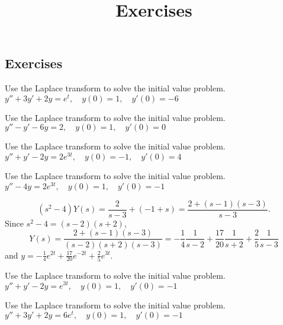 \documentclass{ximera}
\title{Exercises} \license{CC BY-NC-SA 4.0}
\begin{document}
\begin{abstract}
\end{abstract}
\maketitle

\begin{onlineOnly}
\section*{Exercises}
\end{onlineOnly}



\begin{problem}\label{exer:8.3.1} Use the Laplace transform to solve the initial value problem. $y''+3y'+2y=e^t, \quad  y(0)=1,\quad y'(0)=-6$
\end{problem}

\begin{problem}\label{exer:8.3.2} Use the Laplace transform to solve the initial value problem. $y''-y'-6y=2, \quad  y(0)=1,\quad y'(0)=0$
\end{problem}

\begin{problem}\label{exer:8.3.3} Use the Laplace transform to solve the initial value problem. $y''+y'-2y=2e^{3t}, \quad  y(0)=-1,\quad y'(0)=4$
\end{problem}

\begin{problem}\label{exer:8.3.4} Use the Laplace transform to solve the initial value problem. $y''-4y=2 e^{3t}, \quad  y(0)=1,\quad y'(0)=-1$

\begin{solution}
$$
(s^2-4)Y(s)=\frac{2}{s-3}+(-1+s)=\frac{2+(s-1)(s-3)}{s-3}.
$$
Since $s^2-4=(s-2)(s+2)$,
$$
Y(s)=\frac{2+(s-1)(s-3)}{(s-2)(s+2)(s-3)}=
-\frac{1}{4}\frac{1}{s-2}+\frac{17}{20}\frac{1}{s+2}+\frac{2}{5}\frac{1}{s-3}
$$
and   $y=-\frac{1}{4}e^{2t}+\frac{17}{20}e^{-2t}+\frac{2}{5}e^{3t}$.
\end{solution}
\end{problem}

\begin{problem}\label{exer:8.3.5} Use the Laplace transform to solve the initial value problem. $y''+y'-2y=e^{3t}, \quad  y(0)=1,\quad y'(0)=-1$
\end{problem}

\begin{problem}\label{exer:8.3.6} Use the Laplace transform to solve the initial value problem. $y''+3y'+2y=6e^t, \quad  y(0)=1,\quad y'(0)=-1$
\end{problem}
\end{document}
